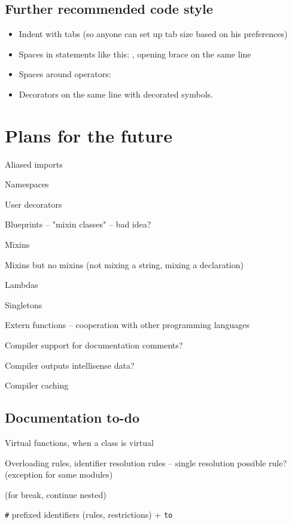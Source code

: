 \section{Further recommended code style}
\begin{itemize}
	\item Indent with tabs (so anyone can set up tab size based on his preferences)
	\item Spaces in statements like this: , opening brace on the same line
	\item Spaces around operators: 
	\item Decorators on the same line with decorated symbols.
\end{itemize}

\chapter{Plans for the future}
\begin{compactitem}
	\item Aliased imports
	\item Namespaces
	\item User decorators
	\item Blueprints -- "mixin classes" -- bad idea?
	\item Mixins
	\item Mixins but no mixins (not mixing a string, mixing a declaration)
	\item Lambdas
	\item Singletons
	\item Extern functions -- cooperation with other programming languages
	\item Compiler support for documentation comments?
	\item Compiler outputs intellisense data?
	\item Compiler caching
\end{compactitem}

\section{Documentation to-do}
\begin{compactitem}
	\item Virtual functions, when a class is virtual
	\item Overloading rules, identifier resolution rules -- single resolution possible rule? (exception for same modules)
	\item {}
	\item {} (for break, continue nested)
	\item {}
	\item \verb|#| prefixed identifiers (rules, restrictions) + \verb|to|
	\item {}
\end{compactitem}

